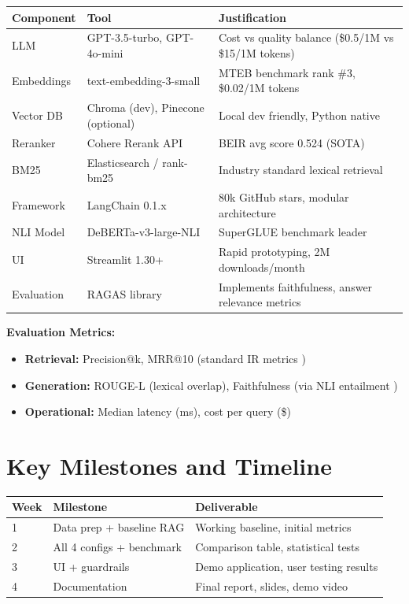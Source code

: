 \documentclass[11pt,a4paper]{article}
\begin{document}
\begin{table}[h]
\centering
\small
\begin{tabular}{@{}lll@{}}
\toprule
\textbf{Component} & \textbf{Tool} & \textbf{Justification} \\ \midrule
LLM & GPT-3.5-turbo, GPT-4o-mini & Cost vs quality balance (\$0.5/1M vs \$15/1M tokens) \\
Embeddings & text-embedding-3-small & MTEB benchmark rank \#3, \$0.02/1M tokens \cite{mteb2024} \\
Vector DB & Chroma (dev), Pinecone (optional) & Local dev friendly, Python native \\
Reranker & Cohere Rerank API & BEIR avg score 0.524 (SOTA) \cite{cohere2024} \\
BM25 & Elasticsearch / rank-bm25 & Industry standard lexical retrieval \\
Framework & LangChain 0.1.x & 80k GitHub stars, modular architecture \\
NLI Model & DeBERTa-v3-large-NLI & SuperGLUE benchmark leader \cite{he2021deberta} \\
UI & Streamlit 1.30+ & Rapid prototyping, 2M downloads/month \\
Evaluation & RAGAS library & Implements faithfulness, answer relevance metrics \cite{ragas2024} \\
\bottomrule
\end{tabular}
\end{table}

\textbf{Evaluation Metrics:}
\begin{itemize}[leftmargin=*,nosep]
    \item \textbf{Retrieval:} Precision@k, MRR@10 (standard IR metrics \cite{manning2008ir})
    \item \textbf{Generation:} ROUGE-L (lexical overlap), Faithfulness (via NLI entailment \cite{ragas2024})
    \item \textbf{Operational:} Median latency (ms), cost per query (\$)
\end{itemize}

\section{Key Milestones and Timeline}

\begin{table}[h]
\centering
\small
\begin{tabular}{@{}lll@{}}
\toprule
\textbf{Week} & \textbf{Milestone} & \textbf{Deliverable} \\ \midrule
1 & Data prep + baseline RAG & Working baseline, initial metrics \\
2 & All 4 configs + benchmark & Comparison table, statistical tests \\
3 & UI + guardrails & Demo application, user testing results \\
4 & Documentation & Final report, slides, demo video \\
\bottomrule
\end{tabular}
\end{table}
\end{document}
